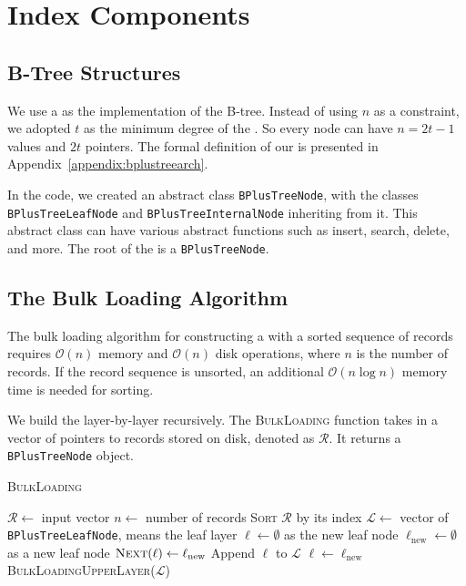 \section{Index Components}
\label{sec:index}

\subsection{B-Tree Structures}

We use a \bplustree as the implementation of the B-tree. Instead of using $n$ as a constraint, we adopted $t$ as the minimum degree of the \bplustree. So every node can have $n=2t - 1$ values and $2t$ pointers. The formal definition of our \bplustree is presented in Appendix~\ref{appendix:bplustreearch}.

In the code, we created an abstract class \texttt{BPlusTreeNode}, with the classes \texttt{BPlusTreeLeafNode} and \texttt{BPlusTreeInternalNode} inheriting from it. This abstract class can have various abstract functions such as insert, search, delete, and more. The root of the \bplustree is a \texttt{BPlusTreeNode}.

\subsection{The Bulk Loading Algorithm}

The bulk loading algorithm for constructing a \bplustree with a sorted sequence of records requires $\mathcal{O}(n)$ memory and $\mathcal{O}(n)$ disk operations, where $n$ is the number of records. If the record sequence is unsorted, an additional $\mathcal{O}(n\log n)$ memory time is needed for sorting.

We build the \bplustree layer-by-layer recursively. The \textsc{BulkLoading} function takes in a vector of pointers to records stored on disk, denoted as $\mathcal{R}$. It returns a \texttt{BPlusTreeNode} object.

\begin{algorithm}
	\caption{\textsc{BulkLoading}}
	\begin{algorithmic}
        \State $\mathcal{R} \leftarrow $ input vector
        \State $n\leftarrow$ number of records
        \State \textsc{Sort} $\mathcal{R}$ by its index
        \State $\mathcal{L} \leftarrow $ vector of \texttt{BPlusTreeLeafNode}, means the leaf layer
        \State $\ell \leftarrow\emptyset$ as the new leaf node
            \State $\ell_{\mathrm{new}}\leftarrow\emptyset$ as a new leaf node
            \State $\textsc{Next}(\ell)\leftarrow\ell_{\mathrm{new}}$
            \State Append $\ell$ to $\mathcal{L}$
            \State $\ell\leftarrow\ell_{\mathrm{new}}$
        \EndIf
        \EndFor
        \State \Return \textsc{BulkLoadingUpperLayer($\mathcal{L}$)}
	\end{algorithmic}
\end{algorithm}


